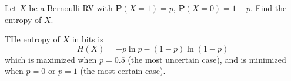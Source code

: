 \documentclass[device=normal, lang=en]{elegantbook}
\numberwithin{equation}{section}
\begin{document}
\begin{example}
    Let $X$ be a Bernoulli RV with $\mathbf{P}(X = 1) = p$, $\mathbf{P}(X = 0) = 1 - p$. Find the entropy of $X$.
\end{example}
\begin{solution}
    THe entropy of $X$ in bits is
    \begin{equation}
        H(X) = -p \ln p - (1 - p) \ln (1 - p)
    \end{equation}
    which is maximized when $p = 0.5$ (the most uncertain case), and is minimized when $p = 0$ or $p = 1$ (the most certain case). 
\end{solution}


\appendix

\end{document}
